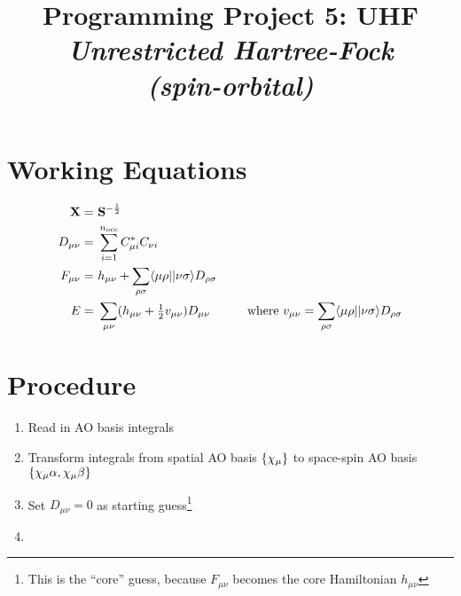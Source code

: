 \documentclass[fleqn]{article}
\title{Programming Project 5: UHF\\
\textit{Unrestricted Hartree-Fock\\(spin-orbital)}}
\author{}
\date{}
\begin{document}
\maketitle

\section*{Working Equations}

\begin{align}
  \mathbf{X}
=&\
  \mathbf{S}^{-\frac{1}{2}}
\\
  D_{\mu\nu}
=&\
  \sum_{i=1}^{n_\text{occ}}
  C_{\mu i}^* C_{\nu i}
\\
  F_{\mu\nu}
=&\
  h_{\mu\nu}
+
  \sum_{\rho\sigma}
  \langle\mu\rho||\nu\sigma\rangle
  D_{\rho\sigma}
\\
  E
=&\
  \sum_{\mu\nu}
  (h_{\mu\nu}+\tfrac{1}{2}v_{\mu\nu})D_{\mu\nu}
\hspace{30pt}\text{where }
  v_{\mu\nu}
=
  \sum_{\rho\sigma}
  \langle\mu\rho||\nu\sigma\rangle
  D_{\rho\sigma}
\end{align}

\section*{Procedure}

\begin{enumerate}
  \item Read in AO basis integrals
  \item Transform integrals from spatial AO basis $\{\chi_\mu\}$ to space-spin AO basis $\{\chi_\mu\alpha,\chi_\mu\beta\}$
  \item Set $D_{\mu\nu}=0$ as starting guess\footnote{This is the ``core'' guess, because $F_{\mu\nu}$ becomes the core Hamiltonian $h_{\mu\nu}$}
  \item 
\end{enumerate}
\end{document}
